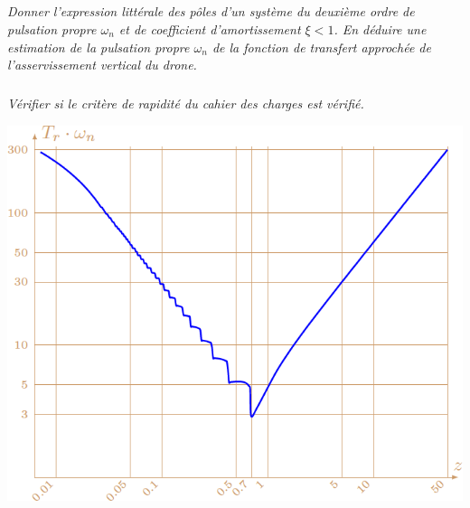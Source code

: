 \documentclass[10pt,fleqn]{article} %
\begin{document}
\begin{multicols}{2}
\subparagraph{}\textit{Donner l’expression littérale des pôles d’un système du deuxième ordre de pulsation propre $\omega_n$ et de coefficient d’amortissement $\xi<1$. En déduire une estimation de la pulsation propre $\omega_n$ de la
fonction de transfert approchée de l’asservissement vertical du drone.}

\subparagraph{}\textit{Vérifier si le critère de rapidité du cahier des charges est vérifié.}

\begin{center}
\includegraphics[width=\linewidth]{images/fig_09}
\end{center}






\end{multicols}
\end{document}

